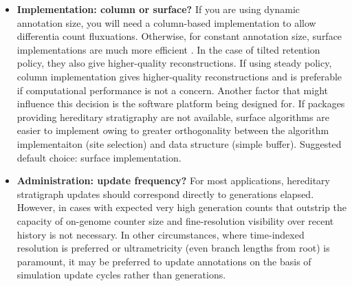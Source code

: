 \begin{itemize}
  According to results here, simulation scale does not appear to be a major factor in considering annotation size, because at the same absolute sample sizes samples from differently sized populations have no clear trend in reconstruction quality characteristics.
  However, sample size may play into decision of annotation size (see below).

  Note that in addition to differentia values, a generation counter will also need to be stored in genomes (for most use cases, a 32- or 64-bit value).

  In scenarios where explicitly differentiating between founding clades is paramount, consider adding a systematically assigned founder ID or randomly generated fixed tag.
  This tag would then be as a first pass to divvy end genomes between founding origins before feeding into the rest of the reconstruction pipeline.
  \footnote{One possible exception is cases where a global monotonic counter is available and it is desirable to demarcate phylogenetic history in terms of simulation time rather than generations.}
\item \textbf{Implementation: column or surface?}
  If you are using dynamic annotation size, you will need a column-based implementation to allow differentia count fluxuations.
  Otherwise, for constant annotation size, surface implementations are much more efficient \citep{TODOOTHERPAPER}.
  In the case of tilted retention policy, they also give higher-quality reconstructions.
  If using steady policy, column implementation gives higher-quality reconstructions and is preferable if computational performance is not a concern.
  Another factor that might influence this decision is the software platform being designed for.
  If packages providing hereditary stratigraphy are not available, surface algorithms are easier to implement owing to greater orthogonality between the algorithm implementaiton (site selection) and data structure (simple buffer).
  Suggested default choice: surface implementation.
\item \textbf{Administration: update frequency?}
  For most applications, hereditary stratigraph updates should correspond directly to generations elapsed.
  However, in cases with expected very high generation counts that outstrip the capacity of on-genome counter size and fine-resolution visibility over recent history is not necessary.
  In other circumstances, where time-indexed resolution is preferred or ultrametricity (even branch lengths from root) is paramount, it may be preferred to update annotations on the basis of simulation update cycles rather than generations.

\end{itemize}
